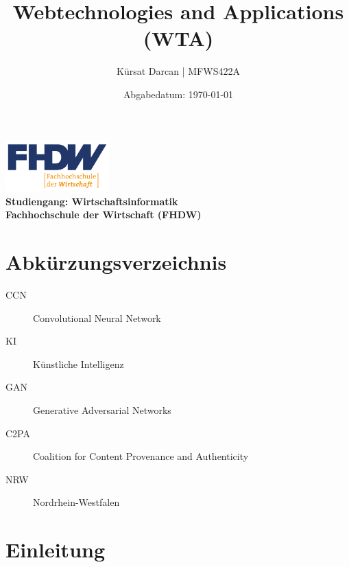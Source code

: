 \documentclass[a4paper,12pt]{article}
\title{\textbf{Webtechnologies and Applications (WTA)}}
\author{Kürsat Darcan | MFWS422A}
\date{Abgabedatum: \today}
\begin{document}
\maketitle
\thispagestyle{empty}
\vspace{2cm}
\begin{center}
    \includegraphics[width=0.3\textwidth]{FHDW_Logo_RGB-01.svg.png} %
    \\
    \vspace{1cm}
    \textbf{Studiengang: Wirtschaftsinformatik}\\
    \textbf{Fachhochschule der Wirtschaft (FHDW)}
\end{center}
\newpage

\renewcommand{\thepage}{\roman{page}} %
\tableofcontents
\newpage

\listoffigures
{}
\newpage


\section*{Abkürzungsverzeichnis}
\begin{description}
    \item[CCN] Convolutional Neural Network
    \item[KI] Künstliche Intelligenz 
    \item[GAN] Generative Adversarial Networks
    \item[C2PA] Coalition for Content Provenance and Authenticity
    \item[NRW] Nordrhein-Westfalen
\end{description}
\newpage

\renewcommand{\thepage}{\arabic{page}} %
\setcounter{page}{1}


\section{Einleitung}
\end{document}
